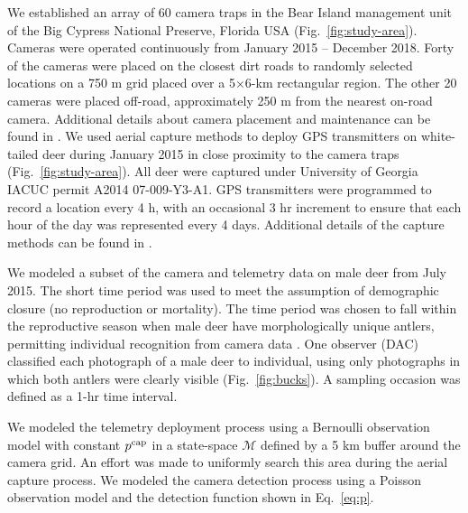 \documentclass[12pt]{article}
\begin{document}
We established an array of 60 camera traps in the Bear Island
management unit of the Big Cypress National Preserve, Florida USA
(Fig.~\ref{fig:study-area}). Cameras were operated continuously from
January 2015 -- December 2018. Forty of the cameras were placed
on the closest dirt roads to randomly selected locations on a 750 m
grid placed over a 5$\times$6-km rectangular region.
The other 20 cameras were placed off-road, approximately 250 m from
the nearest on-road camera. Additional details about camera placement and
maintenance can be found in \citet{chandler_etal:2018mee}.
We used aerial capture methods to deploy GPS transmitters on 
white-tailed deer during January 2015 in close proximity to the camera
traps (Fig.~\ref{fig:study-area}). All deer were
captured under University of Georgia IACUC permit A2014
07-009-Y3-A1. GPS transmitters were programmed to record a location
every 4 h, with an occasional 3 hr increment to ensure that each hour
of the day was represented every 4 days. Additional details of the
capture methods can be found in \citet{cherry_etal:2018}.

We modeled a subset of the camera and telemetry data on male deer
from July 2015. The short time period was used to meet the
assumption of demographic closure (no reproduction or mortality). The
time period was chosen to fall within the reproductive season when male deer have
morphologically unique antlers, permitting individual recognition from
camera data \citep{beaver_etal:2016}. One observer (DAC) classified each
photograph of a male deer to individual, using only photographs in
which both antlers were clearly visible (Fig.~\ref{fig:bucks}).
A sampling occasion was defined as a 1-hr time interval.

We modeled the telemetry deployment process using a Bernoulli
observation model with constant $p^{\rm cap}$ in a state-space
$\mathcal M$ defined by a 5 km buffer around the camera grid.
An effort was made to uniformly search this area during the aerial
capture process. 
We modeled the camera detection process using a Poisson observation
model and the detection function shown in Eq.~\ref{eq:p}. 
\end{document}
